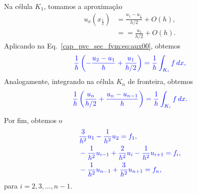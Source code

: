 Na célula $K_1$, tomamos a aproximação
\begin{subequations}
  \begin{align}
    u_x\left(x_{\frac{1}{2}}\right) &= \frac{u_{1} - u_{\frac{1}{2}}}{h/2} + O\left(h\right),\\
                                    &= = \frac{u_{1}}{h/2} + O\left(h\right).
  \end{align}
\end{subequations}
Aplicando na Eq.~\eqref{cap_pvc_sec_fvm:eq:aux00}, obtemos
\begin{equation}\color{blue}\frac{1}{h}\left(-\frac{u_{2}-u_{1}}{h} + \frac{u_1}{h/2}\right) = \frac{1}{h}\int_{K_i}f\,dx,
\end{equation}
Analogamente, integrando na célula $K_n$ de fronteira, obtemos
\begin{equation}\color{blue}\frac{1}{h}\left(\frac{u_{n}}{h/2} + \frac{u_{n} - u_{n-1}}{h}\right) = \frac{1}{h}\int_{K_i}f\,dx.
\end{equation}

Por fim, obtemos o 
\begin{subequations}\hleq
  \begin{align}
    &\frac{3}{h^2}u_1 - \frac{1}{h^2}u_{2} = f_1,\\
    &-\frac{1}{h^2}u_{i-1} + \frac{2}{h^2}u_i - \frac{1}{h^2}u_{i+1} = f_i,\\
    &-\frac{1}{h^2}u_{n-1} + \frac{3}{h^2}u_{n+1} = f_n,
  \end{align}
\end{subequations}
para $i = 2, 3, \dotsc, n-1$.

